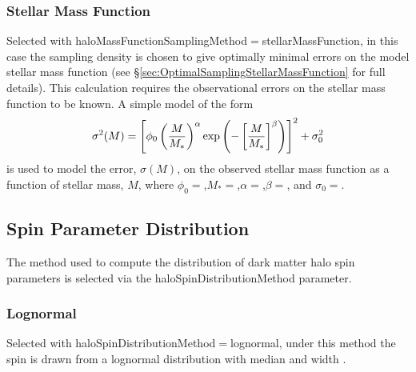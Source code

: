\subsubsection{Stellar Mass Function}

Selected with {\normalfont \ttfamily haloMassFunctionSamplingMethod}$=${\normalfont \ttfamily stellarMassFunction}, in this case the sampling density is chosen to give optimally minimal errors on the model stellar mass function (see \S\ref{sec:OptimalSamplingStellarMassFunction} for full details). This calculation requires the observational errors on the stellar mass function to be known. A simple model of the form
\begin{equation}
 \sigma^2(M) = \left[\phi_0 \left({M\over M_*}\right)^\alpha \exp\left(-\left[{M\over M_*}\right]^\beta\right)\right]^2 + \sigma_0^2
\end{equation}
is used to model the error, $\sigma(M)$, on the observed stellar mass function as a function of stellar mass, $M$, where $\phi_0=${\normalfont \ttfamily [haloMassFunctionSamplingStellarMassFunctionErrorPhi0]},$M_*=${\normalfont \ttfamily [haloMassFunctionSamplingStellarMassFunctionErrorMstar]},$\alpha=${\normalfont \ttfamily [haloMassFunctionSamplingStellarMassFunctionErrorAlpha]},$\beta=${\normalfont \ttfamily [haloMassFunctionSamplingStellarMassFunctionErrorBeta]}, and $\sigma_0=${\normalfont \ttfamily [haloMassFunctionSamplingStellarMassFunctionErrorConstant]}.

\subsection{Spin Parameter Distribution}\label{sec:SpinParameterDistribution}

The method used to compute the distribution of dark matter halo spin parameters is selected via the {\normalfont \ttfamily haloSpinDistributionMethod} parameter.

\subsubsection{Lognormal}\label{phys:haloSpinDistribution:haloSpinDistributionLogNormal}

Selected with {\normalfont \ttfamily haloSpinDistributionMethod}$=${\normalfont \ttfamily lognormal}, under this method the spin is drawn from a lognormal distribution with median {\normalfont \ttfamily [lognormalSpinDistributionMedian]} and width {\normalfont \ttfamily [lognormalSpinDistributionSigma]}.

